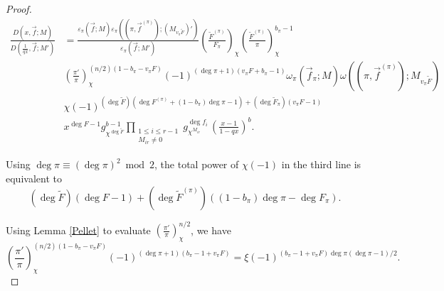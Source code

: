 \documentclass[11pt,letterpaper]{article}
\theoremstyle{definition}
\theoremstyle{remark}
\numberwithin{equation}{section}
\theoremstyle{dotless}
\newcommand{\res}[2]{\left(\frac{#1}{#2}\right)}
\renewcommand{\tilde}{\widetilde}
\begin{document}
\begin{proof}

\begin{equation*}
\begin{split}
\frac{D(x, \vec{f}; M)} {D\left(\frac{1}{qx}, \vec{f}; M'\right)} &=\frac{\varepsilon_\pi(\vec{f}; M)\varepsilon_\pi((\pi, \vec{f}^{(\pi)}); (M_{v_\pi\tilde{F}})')}{\varepsilon_\pi(\vec{f}; M')} 
\res{\tilde{F}^{(\pi)}}{F_\pi}_\chi \res{\tilde{F}^{(\pi)}}{\pi}_\chi^{b_\pi-1} \\
& \res{\pi'}{\pi}_\chi^{(n/2)(1-b_\pi-v_\pi F)} (-1)^{(\deg \pi+1)(v_\pi F+ b_{\pi}-1)} \omega_\pi(\vec{f}_\pi; M) \omega((\pi, \vec{f}^{(\pi)}); M_{v_\pi \tilde{F}})  \\
& \chi(-1)^{(\deg \tilde{F})(\deg F^{(\pi)}+(1-b_\pi)\deg \pi -1)+(\deg \tilde{F}_\pi)(v_\pi F-1)} \\
&x^{\deg F-1} g_{\chi^{\deg \tilde{F}}} ^{b-1} \prod_{\substack{1 \leq i \leq r-1 \\ M_{ir} \neq 0}} g_{\chi^{M_{ir}}} ^{\deg f_i} \, \left( \frac{x-1}{1-qx}\right)^b.
\end{split}
\end{equation*}

Using $\deg \pi \equiv (\deg \pi)^2 \bmod 2$, the total power of $\chi(-1)$ in the third line is equivalent to 
\begin{equation*}
(\deg \tilde{F})(\deg F -1)+(\deg \tilde{F}^{(\pi)})((1-b_\pi)\deg \pi-\deg F_\pi).
\end{equation*}

Using Lemma \ref{Pellet} to evaluate $\res{\pi'}{\pi}_\chi^{n/2}$, we have 
\begin{equation*}
\res{\pi'}{\pi}_\chi^{(n/2)(1-b_\pi-v_\pi F)} (-1)^{(\deg \pi+1)(b_\pi-1+v_\pi F)} = \xi(-1)^{(b_\pi-1+v_\pi F)\deg \pi(\deg \pi -1)/2}.
\end{equation*}


\end{proof}
\end{document}

